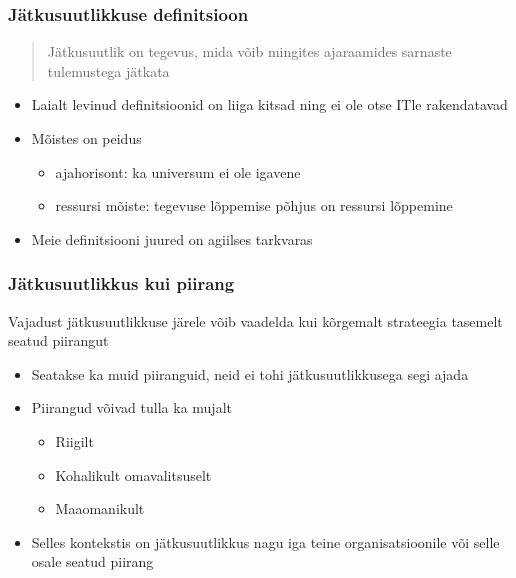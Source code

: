 \begin{frame}[fragile]
  \frametitle{Jätkusuutlikkuse definitsioon}
  \begin{center}
  	\begin{quote}
		Jätkusuutlik on tegevus, mida võib mingites ajaraamides sarnaste tulemustega jätkata 
	\end{quote}
  \end{center}

	\begin{itemize}
		\item Laialt levinud definitsioonid on liiga kitsad ning ei ole otse ITle rakendatavad
		\item Mõistes on peidus 
		\begin{itemize}
			\item ajahorisont: ka universum ei ole igavene
			\item ressursi mõiste: tegevuse lõppemise põhjus on ressursi lõppemine
		\end{itemize}
		
		
		\item Meie definitsiooni juured on agiilses tarkvaras \citep{sustainable}
	\end{itemize}
\end{frame}

\begin{frame}[fragile]
  \frametitle{Jätkusuutlikkus kui piirang}
 Vajadust jätkusuutlikkuse järele võib vaadelda kui kõrgemalt strateegia tasemelt seatud piirangut

	\begin{itemize}
		\item Seatakse ka muid piiranguid, neid ei tohi jätkusuutlikkusega segi ajada
		\item Piirangud võivad tulla ka mujalt
			\begin{itemize}
				\item Riigilt
				\item Kohalikult omavalitsuselt
				\item Maaomanikult
			\end{itemize}
		\item Selles kontekstis on jätkusuutlikkus nagu iga teine organisatsioonile või selle osale seatud piirang
	\end{itemize}
\end{frame}

